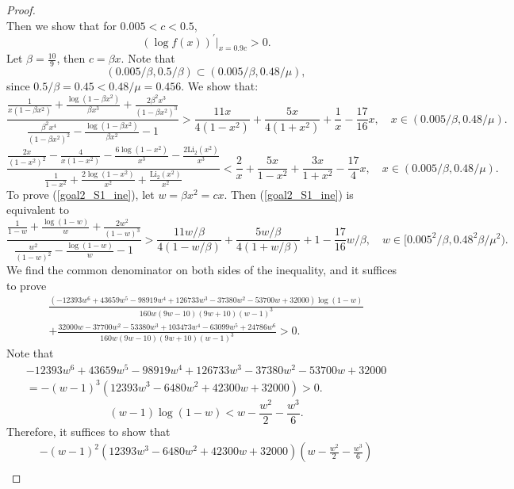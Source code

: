 ﻿\documentclass[10pt]{article}
\begin{document}
\begin{proof}
$$$$
Then we show that for $0.005<c<0.5$, 
$$(\log f(x))^{'}\bigg|_{x=0.9c}>0.
$$
Let $\beta = \frac{10}{9}$, then $c=\beta x$. Note that
\[
(0.005/\beta, 0.5/\beta)\subset(0.005/\beta, 0.48/\mu),
\]
since $0.5/\beta=0.45<0.48/\mu=0.456$. We show that:
\begin{equation}
    \frac{\frac{1}{x(1-\beta x^2)}+\frac{\log(1-\beta x^2)}{\beta x^3}+\frac{2\beta^2x^3}{(1-\beta x^2)^3}}{\frac{\beta^2x^4}{(1-\beta x^2)^{2}}-\frac{\log(1-\beta x^2)}{\beta x^2}-1}>\frac{11x}{4(1-x^2)}+\frac{5x}{4(1+x^2)}+\frac{1}{x}-\frac{17}{16}x, \quad x\in(0.005/\beta, 0.48/\mu).\label{goal2_S1_ine}
\end{equation}
\begin{equation}
    \frac{\frac{2x}{(1-x^2)^2}-\frac{4}{x(1-x^2)}-\frac{6\log(1-x^2)}{x^3}-\frac{2\text{Li}_2(x^2)}{x^3}}{\frac{1}{1-x^2}+\frac{2\log(1-x^2)}{x^2}+\frac{\text{Li}_2(x^2)}{x^2}}<\frac{2}{x}+\frac{5x}{1-x^2}+\frac{3x}{1+x^2}-\frac{17}{4}x, \quad x\in(0.005/\beta, 0.48/\mu).\label{goal2_S2_ine}
\end{equation}
To prove (\ref{goal2_S1_ine}), let $w = \beta x^2 = cx$. Then (\ref{goal2_S1_ine}) is equivalent to
\begin{equation}
    \frac{\frac{1}{1-w}+\frac{\log(1-w)}{w}+\frac{2w^2}{(1-w)^3}}{\frac{w^2}{(1-w)^{2}}-\frac{\log(1-w)}{w}-1}>\frac{11w/\beta}{4(1-w/\beta)}+\frac{5w/\beta}{4(1+w/\beta)}+1-\frac{17}{16}w/\beta, \quad w\in[0.005^2/\beta, 0.48^2\beta/\mu^2).
\end{equation}
We find the common denominator on both sides of the inequality, and it suffices to prove
\begin{equation}
\begin{aligned}
    \frac{(- 12393w^6 + 43659w^5 - 98919w^4 + 126733w^3 - 37380w^2 - 53700w + 32000)\log(1-w)}{160w(9w - 10)(9w + 10)(w - 1)^3}\\
    +\frac{32000w- 37700w^2 - 53380w^3 + 103473w^4 - 63099w^5 + 24786w^6}{160w(9w - 10)(9w + 10)(w - 1)^3}>0.
\end{aligned}
\end{equation}
Note that
\begin{align*}
    - 12393w^6 + 43659w^5 - 98919w^4 + 126733w^3 - 37380w^2 - 53700w + 32000\\ = -(w-1)^3(12393w^3 - 6480w^2 + 42300w + 32000)>0.
\end{align*}
$$(w-1)\log(1-w)<w-\frac{w^2}{2}-\frac{w^3}{6}.
$$
Therefore, it suffices to show that
\begin{align*}
    -(w-1)^2(12393w^3 - 6480w^2 + 42300w + 32000)(w-\frac{w^2}{2}-\frac{w^3}{6})\\

\end{align*}
\end{proof}
\end{document}

